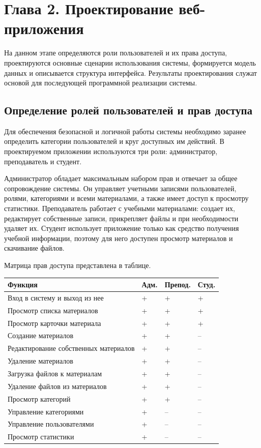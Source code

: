 \section*{Глава 2. Проектирование веб-приложения}

На данном этапе определяются роли пользователей и их права доступа, проектируются основные сценарии использования системы, формируется модель данных и описывается структура интерфейса. Результаты проектирования служат основой для последующей программной реализации системы.

\subsection{Определение ролей пользователей и прав доступа}

Для обеспечения безопасной и логичной работы системы необходимо заранее определить категории пользователей и круг доступных им действий. В проектируемом приложении используются три роли: администратор, преподаватель и студент.

Администратор обладает максимальным набором прав и отвечает за общее сопровождение системы. Он управляет учетными записями пользователей, ролями, категориями и всеми материалами, а также имеет доступ к просмотру статистики. Преподаватель работает с учебными материалами: создает их, редактирует собственные записи, прикрепляет файлы и при необходимости удаляет их. Студент использует приложение только как средство получения учебной информации, поэтому для него доступен просмотр материалов и скачивание файлов.

Матрица прав доступа представлена в таблице.

\begin{center}
\small\begin{tabularx}{0.96\textwidth}{>{\raggedright\arraybackslash}p{7.8cm} >{\centering\arraybackslash}p{1.6cm} >{\centering\arraybackslash}p{2.1cm} >{\centering\arraybackslash}p{2.0cm}}
\toprule
\textbf{Функция} & \textbf{Адм.} & \textbf{Препод.} & \textbf{Студ.} \\
\midrule
Вход в систему и выход из нее & + & + & + \\
Просмотр списка материалов & + & + & + \\
Просмотр карточки материала & + & + & + \\
Создание материалов & + & + & -- \\
Редактирование собственных материалов & + & + & -- \\
Удаление материалов & + & + & -- \\
Загрузка файлов к материалам & + & + & -- \\
Удаление файлов из материалов & + & + & -- \\
Просмотр категорий & + & + & -- \\
Управление категориями & + & -- & -- \\
Управление пользователями & + & -- & -- \\
Просмотр статистики & + & -- & -- \\
\bottomrule
\end{tabularx}
\end{center}

